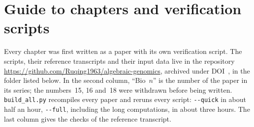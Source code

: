\chapter*{Guide to chapters and verification scripts}

Every chapter was first written as a paper with its own verification script. The scripts, their
reference transcripts and their input data live in the repository
\url{https://github.com/Ruqing1963/algebraic-genomics}, archived under
DOI~\href{https://doi.org/\AGdoi}{\texttt{\AGdoi}}, in the folder listed below. In the second
column, ``Bio~$n$'' is the number of the paper in its series; the numbers~15, 16 and~18 were
withdrawn before being written. \texttt{build\_all.py} recompiles every paper and reruns every
script: \texttt{-{}-quick} in about half an hour, \texttt{-{}-full}, including the long computations, in about three hours.
The last column gives the checks of the reference transcript.

